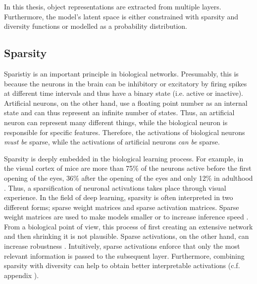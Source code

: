 In this thesis, object representations are extracted from multiple layers. Furthermore, the model's latent space is either constrained with sparsity and diversity functions or modelled as a probability distribution.

\subsection{Sparsity}
Sparistiy is an important principle in biological networks.
Presumably, this is because the neurons in the brain can be inhibitory or excitatory by firing spikes at different time intervals and thus have a binary state (i.e. active or inactive). Artificial neurons, on the other hand, use a floating point number as an internal state and can thus represent an infinite number of states.
Thus, an artificial neuron can represent many different things, while the biological neuron is responsible for specific features.
Therefore, the activations of biological neurons \emph{must be} sparse, while the activations of artificial neurons \emph{can be} sparse.

Sparsity is deeply embedded in the biological learning process.
For example, in the visual cortex of mice are more than 75\% of the neurons active before the first opening of the eyes, 36\% after the opening of the eyes and only 12\% in adulthood .
Thus, a sparsification of neuronal activations takes place through visual experience.
In the field of deep learning, sparsity is often interpreted in two different forms; sparse weight matrices and sparse activation matrices.
Sparse weight matrices are used to make models smaller or to increase inference speed .
From a biological point of view, this process of first creating an extensive network and then shrinking it is not plausible.
Sparse activations, on the other hand, can increase robustness \cite{Panousis_Chatzis_Theodoridis_2021}.
Intuitively, sparse activations enforce that only the most relevant information is passed to the subsequent layer.
Furthermore, combining sparsity with diversity can help to obtain better interpretable activations (c.f. appendix ).

